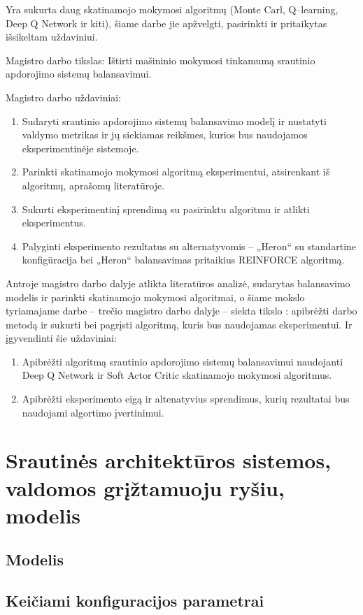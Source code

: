 \documentclass{VUMIFPSbakalaurinis}
\begin{document}
Yra sukurta daug skatinamojo mokymosi algoritmų (Monte Carl, Q–learning, Deep Q Network ir kiti), šiame darbe jie apžvelgti, pasirinkti ir pritaikytas išsikeltam uždaviniui. 

Magistro darbo tikslas: Ištirti mašininio mokymosi tinkamumą srautinio apdorojimo sistemų balansavimui. 

Magistro darbo uždaviniai:
\begin{enumerate}
    \item Sudaryti srautinio apdorojimo sistemų balansavimo modelį ir nustatyti valdymo metrikas ir jų siekiamas reikšmes, kurios bus naudojamos eksperimentinėje sistemoje.
    \item Parinkti skatinamojo mokymosi algoritmą eksperimentui, atsirenkant iš algoritmų, aprašomų literatūroje.
    \item Sukurti eksperimentinį sprendimą su pasirinktu algoritmu ir atlikti eksperimentus.
    \item Palyginti eksperimento rezultatus su alternatyvomis – „Heron“ su standartine konfigūracija bei „Heron“ balansavimas pritaikius REINFORCE algoritmą. 
\end{enumerate}
Antroje magistro darbo dalyje atlikta literatūros analizė, sudarytas balansavimo modelis ir parinkti skatinamojo mokymosi algoritmai, o šiame mokslo tyriamajame darbe – trečio magistro darbo dalyje – siekta tikslo : apibrėžti darbo metodą ir sukurti bei pagrįsti algoritmą, kuris bus naudojamas eksperimentui. Ir įgyvendinti šie uždaviniai:
\begin{enumerate}
    \item Apibrėžti algoritmą srautinio apdorojimo sistemų balansavimui naudojanti Deep Q Network ir Soft Actor Critic skatinamojo mokymosi algoritmus.
    \item Apibrėžti eksperimento eigą ir altenatyvius sprendimus, kurių rezultatai bus naudojami algortimo įvertinimui. 
\end{enumerate}

\section{Srautinės architektūros sistemos, valdomos grįžtamuoju ryšiu, modelis}
\subsection{Modelis}


\subsection{Keičiami konfiguracijos parametrai}
\end{document}
